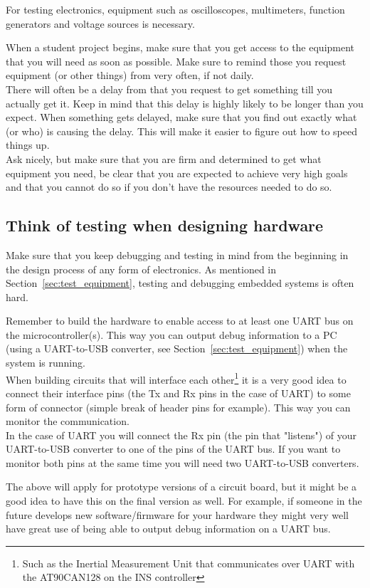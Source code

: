 For testing electronics, equipment such as oscilloscopes, multimeters, function generators and voltage sources is necessary.

When a student project begins, make sure that you get access to the equipment that you will need as soon as possible.  Make sure to remind those you request equipment (or other things) from very often, if not daily. \\
There will often be a delay from that you request to get something till you actually get it. Keep in mind that this delay is highly likely to be longer than you expect. When something gets delayed, make sure that you find out exactly what (or who) is causing the delay. This will make it easier to figure out how to speed things up. \\
Ask nicely, but make sure that you are firm and determined to get what equipment you need, be clear that you are expected to achieve very high goals and that you cannot do so if you don't have the resources needed to do so.


\subsection{Think of testing when designing hardware}\label{sec:testing}
Make sure that you keep debugging and testing in mind from the beginning in the design process of any form of electronics. As mentioned in Section~\ref{sec:test_equipment}, testing and debugging embedded systems is often hard. 

Remember to build the hardware to enable access to at least one UART bus on the microcontroller(s). This way you can output debug information to a PC (using a UART-to-USB converter, see Section~\ref{sec:test_equipment}) when the system is running. \\
When building circuits that will interface each other\footnote{Such as the Inertial Measurement Unit that communicates over UART with the AT90CAN128 on the INS controller} it is a very good idea to connect their interface pins (the Tx and Rx pins in the case of UART) to some form of connector (simple break of header pins for example). This way you can monitor the communication. \\
In the case of UART you will connect the Rx pin (the pin that "listens") of your UART-to-USB converter to one of the pins of the UART bus. If you want to monitor both pins at the same time you will need two UART-to-USB converters.

The above will apply for prototype versions of a circuit board, but it might be a good idea to have this on the final version as well. For example, if someone in the future develops new software/firmware for your hardware they might very well have great use of being able to output debug information on a UART bus.


